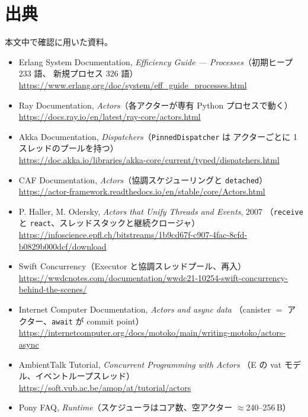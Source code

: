 \documentclass[11pt,a4paper]{ltjsarticle}
\begin{document}
\section{出典}
\label{sec:src}

本文中で確認に用いた資料。

\begin{itemize}\small
\item Erlang System Documentation, \emph{Efficiency Guide --- Processes}（初期ヒープ 233 語、
  新規プロセス 326 語）\\
  \url{https://www.erlang.org/doc/system/eff_guide_processes.html}
\item Ray Documentation, \emph{Actors}（各アクターが専有 Python プロセスで動く）\\
  \url{https://docs.ray.io/en/latest/ray-core/actors.html}
\item Akka Documentation, \emph{Dispatchers}（\texttt{PinnedDispatcher} は
  アクターごとに 1 スレッドのプールを持つ）\\
  \url{https://doc.akka.io/libraries/akka-core/current/typed/dispatchers.html}
\item CAF Documentation, \emph{Actors}（協調スケジューリングと \texttt{detached}）\\
  \url{https://actor-framework.readthedocs.io/en/stable/core/Actors.html}
\item P. Haller, M. Odersky, \emph{Actors that Unify Threads and Events}, 2007
  （\texttt{receive} と \texttt{react}、スレッドスタックと継続クロージャ）\\
  \url{https://infoscience.epfl.ch/bitstreams/1b9cd67f-c907-4fac-8cfd-b0829b000dcf/download}
\item Swift Concurrency（Executor と協調スレッドプール、再入）\\
  \url{https://wwdcnotes.com/documentation/wwdc21-10254-swift-concurrency-behind-the-scenes/}
\item Internet Computer Documentation, \emph{Actors and async data}
  （canister $=$ アクター、\texttt{await} が commit point）\\
  \url{https://internetcomputer.org/docs/motoko/main/writing-motoko/actors-async}
\item AmbientTalk Tutorial, \emph{Concurrent Programming with Actors}
  （E の vat モデル、イベントループスレッド）\\
  \url{https://soft.vub.ac.be/amop/at/tutorial/actors}
\item Pony FAQ, \emph{Runtime}（スケジューラはコア数、空アクター $\approx$240--256\,B）\\

\end{itemize}
\end{document}
